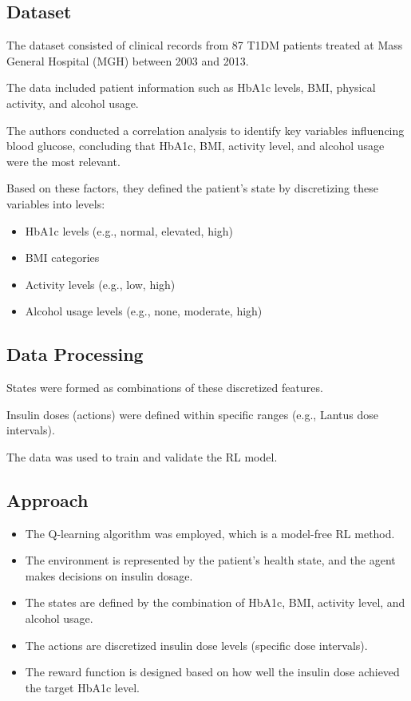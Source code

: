 \subsection*{Dataset}
The dataset consisted of clinical records from 87 T1DM patients treated at Mass General Hospital (MGH) between 2003 and 2013.

The data included patient information such as HbA1c levels, BMI, physical activity, and alcohol usage.

The authors conducted a correlation analysis to identify key variables influencing blood glucose, concluding that HbA1c, BMI, activity level, and alcohol usage were the most relevant.

Based on these factors, they defined the patient’s state by discretizing these variables into levels:
    \begin{itemize}
        \item HbA1c levels (e.g., normal, elevated, high)
        \item BMI categories
        \item Activity levels (e.g., low, high)
        \item Alcohol usage levels (e.g., none, moderate, high)
    \end{itemize}

\subsection*{Data Processing}
States were formed as combinations of these discretized features.

Insulin doses (actions) were defined within specific ranges (e.g., Lantus dose intervals).

The data was used to train and validate the RL model.

\subsection*{Approach}
\begin{itemize}
    \item The Q-learning algorithm was employed, which is a model-free RL method.
    \item The environment is represented by the patient’s health state, and the agent makes decisions on insulin dosage.
    \item The states are defined by the combination of HbA1c, BMI, activity level, and alcohol usage.
    \item The actions are discretized insulin dose levels (specific dose intervals).
    \item The reward function is designed based on how well the insulin dose achieved the target HbA1c level.
\end{itemize}

